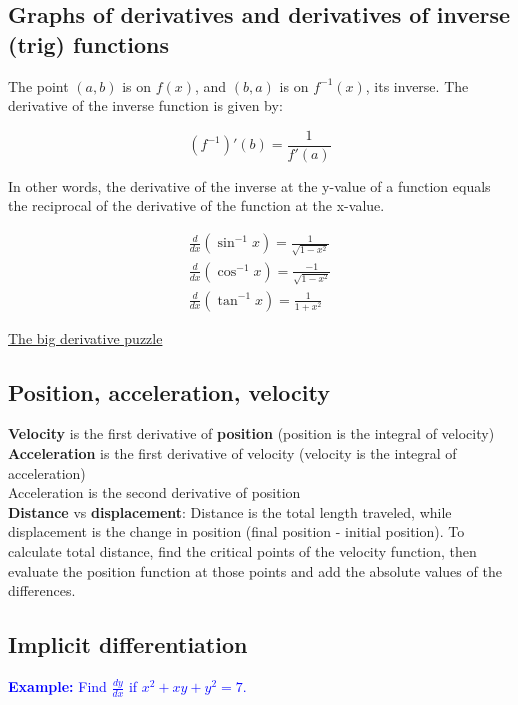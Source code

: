 \documentclass[letterpaper, 12pt]{article}
\newcommand{\example}[1]{\textcolor{blue}{\textbf{Example:} #1}}
\begin{document}
\subsection*{Graphs of derivatives and derivatives of inverse (trig) functions}

The point $(a, b)$ is on $f(x)$, and $(b, a)$ is on $f^{-1}(x)$, its inverse. The derivative of the inverse function is given by:

\[(f^{-1})'(b) = \frac{1}{f'(a)}\]

In other words, the derivative of the inverse at the y-value of a function equals the reciprocal of the derivative of the function at the x-value.

\begin{gather*}
\frac{d}{dx} (\sin^{-1} x) = \frac{1}{\sqrt{1-x^2}} \\
\frac{d}{dx} (\cos^{-1} x) = \frac{-1}{\sqrt{1-x^2}} \\
\frac{d}{dx} (\tan^{-1} x) = \frac{1}{1+x^2}
\end{gather*}

\href{https://english.mathe-online.at/tests/diff1/ablerkennen.html}{The big derivative puzzle}

\subsection*{Position, acceleration, velocity}

\textbf{Velocity} is the first derivative of \textbf{position} (position is the integral of velocity) \\
\textbf{Acceleration} is the first derivative of velocity (velocity is the integral of acceleration) \\
Acceleration is the second derivative of position \\

\textbf{Distance} vs \textbf{displacement}: Distance is the total length traveled, while displacement is the change in position (final position - initial position). To calculate total distance, find the critical points of the velocity function, then evaluate the position function at those points and add the absolute values of the differences.

\subsection*{Implicit differentiation}

\example{Find $\frac{dy}{dx}$ if $x^2+xy+y^2 = 7$.}
\end{document}
